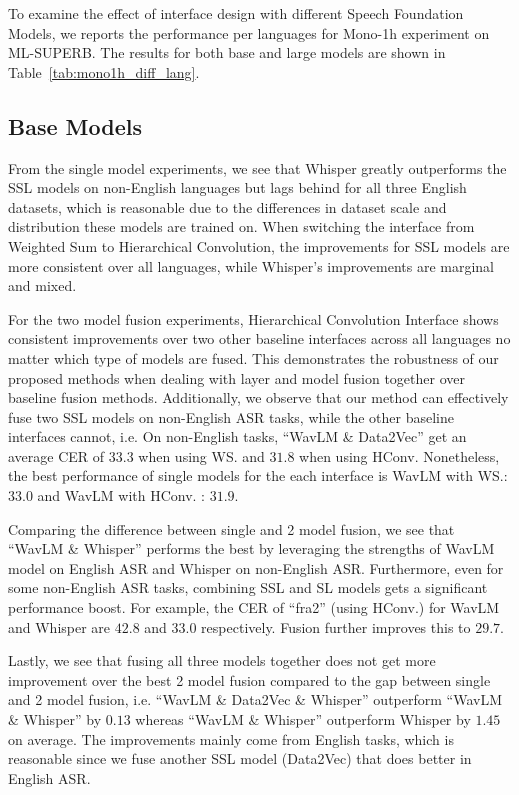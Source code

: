 
To examine the effect of interface design with different Speech Foundation Models, we reports the performance per languages for 
Mono-1h experiment on ML-SUPERB.
The results for both base and large models are shown in Table~\ref{tab:mono1h_diff_lang}.

\subsection{Base Models}
From the single model experiments, we see that Whisper greatly outperforms the SSL models on non-English languages but lags behind for all three English datasets, which is reasonable due to the differences in dataset scale and distribution these models are trained on.
When switching the interface from Weighted Sum to Hierarchical Convolution, the improvements for SSL models are more consistent over all languages, while Whisper's improvements are marginal and mixed.

For the two model fusion experiments, Hierarchical Convolution Interface shows consistent improvements over two other baseline interfaces across all languages no matter which type of models are fused.
This demonstrates the robustness of our proposed methods when dealing with layer and model fusion together over baseline fusion methods.
Additionally, we observe that our method can effectively fuse two SSL models on non-English ASR tasks, while the other baseline interfaces cannot, i.e. 
On non-English tasks, ``WavLM \& Data2Vec'' get an average CER of $33.3$ when using WS. and  $31.8$ when using HConv.
Nonetheless, the best performance of single models for the each interface is WavLM with WS.: $33.0$ and WavLM with HConv. : $31.9$.

Comparing the difference between single and 2 model fusion, we see that ``WavLM \& Whisper'' performs the best by leveraging the strengths of WavLM model on English ASR and Whisper on non-English ASR.
Furthermore, even for some non-English ASR tasks, combining SSL and SL models gets a significant performance boost.
For example, the CER of ``fra2'' (using HConv.) for WavLM and Whisper are $42.8$ and $33.0$ respectively.
Fusion further improves this to $29.7$.

Lastly, we see that fusing all three models together does not get more improvement over the best 2 model fusion compared to the gap between single and 2 model fusion, i.e. ``WavLM \& Data2Vec \& Whisper''  outperform  ``WavLM \& Whisper'' by $0.13$ whereas ``WavLM \& Whisper'' outperform Whisper by $1.45$ on average.
The improvements mainly come from English tasks, which is reasonable since we fuse another SSL model (Data2Vec) that does better in English ASR.

